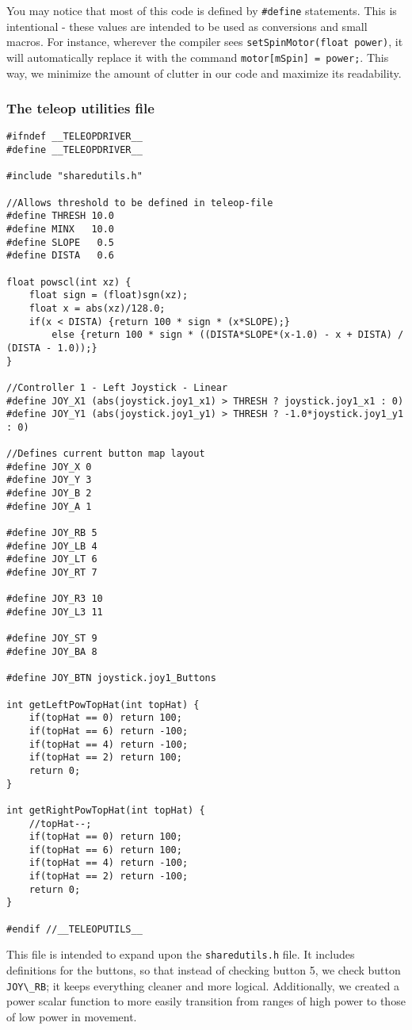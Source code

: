 You may notice that most of this code is defined by \lstinline{#define} statements. This is intentional - these values are intended to be used as conversions and small macros. For instance, wherever the compiler sees \lstinline{setSpinMotor(float power)}, it will automatically replace it with the command \lstinline{motor[mSpin] = power;}. This way, we minimize the amount of clutter in our code and maximize its readability.

\subsubsection{The teleop utilities file}
\begin{lstlisting}
#ifndef __TELEOPDRIVER__
#define __TELEOPDRIVER__

#include "sharedutils.h"

//Allows threshold to be defined in teleop-file
#define THRESH 10.0
#define MINX   10.0
#define SLOPE   0.5
#define DISTA   0.6

float powscl(int xz) {
	float sign = (float)sgn(xz);
	float x = abs(xz)/128.0;
	if(x < DISTA) {return 100 * sign * (x*SLOPE);}
		else {return 100 * sign * ((DISTA*SLOPE*(x-1.0) - x + DISTA) / (DISTA - 1.0));}
}

//Controller 1 - Left Joystick - Linear
#define JOY_X1 (abs(joystick.joy1_x1) > THRESH ? joystick.joy1_x1 : 0)
#define JOY_Y1 (abs(joystick.joy1_y1) > THRESH ? -1.0*joystick.joy1_y1 : 0)

//Defines current button map layout
#define JOY_X 0
#define JOY_Y 3
#define JOY_B 2
#define JOY_A 1

#define JOY_RB 5
#define JOY_LB 4
#define JOY_LT 6
#define JOY_RT 7

#define JOY_R3 10
#define JOY_L3 11

#define JOY_ST 9
#define JOY_BA 8

#define JOY_BTN joystick.joy1_Buttons

int getLeftPowTopHat(int topHat) {
	if(topHat == 0) return 100;
	if(topHat == 6) return -100;
	if(topHat == 4) return -100;
	if(topHat == 2) return 100;
	return 0;
}

int getRightPowTopHat(int topHat) {
	//topHat--;
	if(topHat == 0) return 100;
	if(topHat == 6) return 100;
	if(topHat == 4) return -100;
	if(topHat == 2) return -100;
	return 0;
}

#endif //__TELEOPUTILS__
\end{lstlisting}

This file is intended to expand upon the \lstinline{sharedutils.h} file. It includes definitions for the buttons, so that instead of checking button 5, we check button \lstinline{JOY\_RB}; it keeps everything cleaner and more logical. Additionally, we created a power scalar function to more easily transition from ranges of high power to those of low power in movement.

